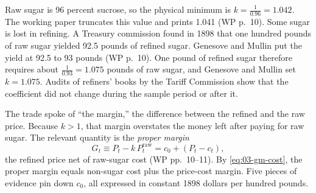 Raw sugar is 96 percent sucrose, so the physical minimum is $k = \frac{1}{0.96} = 1.042$. The working paper
truncates this value and prints 1.041 (WP p.~10). Some sugar is lost
in refining. A Treasury commission found in 1898 that one hundred pounds of raw sugar yielded 92.5 pounds of
refined sugar. Genesove and Mullin put the yield at 92.5 to 93 pounds (WP p.~10). One pound of refined sugar
therefore requires about $\frac{1}{0.93} = 1.075$ pounds of raw sugar, and Genesove and Mullin set
$k = 1.075$. Audits of refiners' books by the Tariff Commission show that the coefficient did not change
during the sample period or after it.

The trade spoke of ``the margin,'' the difference between the refined and the raw price. Because $k > 1$,
that margin overstates the money left after paying for raw sugar. The relevant quantity is the \emph{proper
margin}
\begin{equation}\label{eq:03-gm-proper-margin}
G_t \equiv P_t - k\,P^{\mathrm{raw}}_t = c_0 + (P_t - c_t),
\end{equation}
the refined price net of raw-sugar cost (WP pp.~10--11). By \eqref{eq:03-gm-cost}, the proper margin equals
non-sugar cost plus the price-cost margin. Five pieces of evidence pin down $c_0$, all expressed in constant
1898 dollars per hundred pounds.

